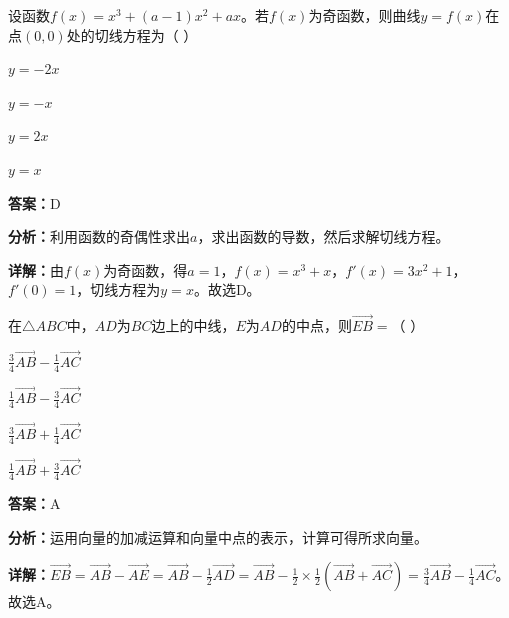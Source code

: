 \begin{question}[points=5]
设函数$f(x)=x^3+(a-1)x^2+ax$。若$f(x)$为奇函数，则曲线$y=f(x)$在点$(0,0)$处的切线方程为（    ）
\begin{choices}
  \item $y=-2x$
  \item $y=-x$
  \item $y=2x$
  \item $y=x$
\end{choices}
\begin{solution}
\textbf{答案：}D

\textbf{分析：}利用函数的奇偶性求出$a$，求出函数的导数，然后求解切线方程。

\textbf{详解：}由$f(x)$为奇函数，得$a=1$，$f(x)=x^3+x$，$f'(x)=3x^2+1$，$f'(0)=1$，切线方程为$y=x$。故选D。
\end{solution}
\end{question}

\begin{question}[points=5]
在$\triangle ABC$中，$AD$为$BC$边上的中线，$E$为$AD$的中点，则$\overrightarrow{EB}=$（    ）
\begin{choices}
  \item $\frac{3}{4}\overrightarrow{AB}-\frac{1}{4}\overrightarrow{AC}$
  \item $\frac{1}{4}\overrightarrow{AB}-\frac{3}{4}\overrightarrow{AC}$
  \item $\frac{3}{4}\overrightarrow{AB}+\frac{1}{4}\overrightarrow{AC}$
  \item $\frac{1}{4}\overrightarrow{AB}+\frac{3}{4}\overrightarrow{AC}$
\end{choices}
\begin{solution}
\textbf{答案：}A

\textbf{分析：}运用向量的加减运算和向量中点的表示，计算可得所求向量。

\textbf{详解：}$\overrightarrow{EB}=\overrightarrow{AB}-\overrightarrow{AE}=\overrightarrow{AB}-\frac{1}{2}\overrightarrow{AD}=\overrightarrow{AB}-\frac{1}{2}\times\frac{1}{2}(\overrightarrow{AB}+\overrightarrow{AC})=\frac{3}{4}\overrightarrow{AB}-\frac{1}{4}\overrightarrow{AC}$。故选A。
\end{solution}
\end{question}

